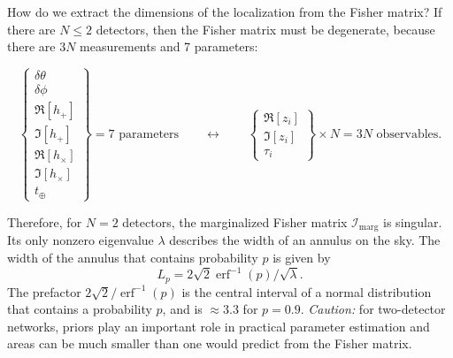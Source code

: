 \documentclass[amsmath,amssymb,aps,prx,reprint,nopreprintnumbers,nofootinbib]{revtex4-1}
\DeclareMathOperator{\erf}{erf}
\begin{document}
How do we extract the dimensions of the localization from the Fisher matrix? If there are $N \leq 2$ detectors, then the Fisher matrix must be degenerate, because there are $3N$ measurements and 7 parameters:
%
\begin{widetext}
\begin{equation*}
    \left\{
    \begin{array}{c}
        \delta\theta \\
        \delta\phi \\
        \Re[h_+] \\
        \Im[h_+] \\
        \Re[h_\times] \\
        \Im[h_\times] \\
        t_\oplus
    \end{array}
    \right\}
    = 7 \text{ parameters}
    \qquad
    \longleftrightarrow
    \qquad
    \left\{
    \begin{array}{c}
        \Re[z_i] \\
        \Im[z_i] \\
        \tau_i
    \end{array}
    \right\}
    \times N = 3N \text{ observables.}
\end{equation*}
\end{widetext}
%
Therefore, for $N=2$ detectors, the marginalized Fisher matrix $\mathcal{I}_\mathrm{marg}$ is singular. Its only nonzero eigenvalue $\lambda$ describes the width of an annulus on the sky. The width of the annulus that contains probability $p$ is given by
%
\begin{equation}\label{eq:l-pth-quantile}
    L_p = 2 \sqrt{2} \erf^{-1}(p) / \sqrt{\lambda}.
\end{equation}
%
The prefactor $2 \sqrt{2} / \erf^{-1}(p)$ is the central interval of a normal distribution that contains a probability $p$, and is $\approx 3.3$ for $p = 0.9$. \emph{Caution:} for two\nobreakdashes-detector networks, priors play an important role in practical parameter estimation and areas can be much smaller than one would predict from the Fisher matrix.
\end{document}
